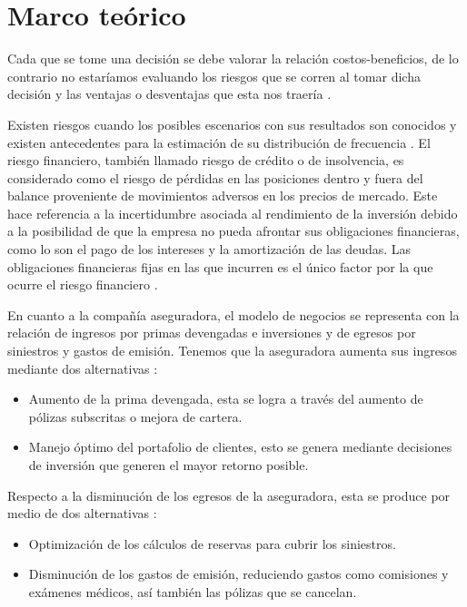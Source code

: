 \documentclass[journal]{IEEEtran}
\begin{document}
    \section{Marco teórico}

        Cada que se tome una decisión se debe valorar la relación costos-beneficios, de lo contrario no estaríamos evaluando los riesgos que se corren al tomar dicha decisión y las ventajas o desventajas que esta nos traería \cite{risk-definition}.
            
        Existen riesgos cuando los posibles escenarios con sus resultados son conocidos y existen antecedentes para la estimación de su distribución de frecuencia \cite{Bazzani}. El riesgo financiero, también llamado riesgo de crédito o de insolvencia, es considerado como el riesgo de pérdidas en las posiciones dentro y fuera del balance proveniente de movimientos adversos en los precios de mercado. Este hace referencia a la incertidumbre asociada al rendimiento de la inversión debido a la posibilidad de que la empresa no pueda afrontar sus obligaciones financieras, como lo son el pago de los intereses y la amortización de las deudas. Las obligaciones financieras fijas en las que incurren es el único factor por la que ocurre el riesgo financiero \cite{Bazzani}.
        
        En cuanto a la compañía aseguradora, el modelo de negocios se representa con la relación de ingresos por primas devengadas e inversiones y de egresos por siniestros y gastos de emisión. Tenemos que la aseguradora aumenta sus ingresos mediante dos alternativas \cite{aseguradora}:
        \begin{itemize}
            \item Aumento de la prima devengada, esta se logra a través del aumento de pólizas  subscritas o mejora de cartera.
            \item Manejo óptimo del portafolio de clientes, esto se genera mediante decisiones de inversión que generen el mayor retorno posible.
        \end{itemize}
        
        Respecto a la disminución de los egresos de la aseguradora, esta se produce por medio de dos alternativas \cite{aseguradora}:
        \begin{itemize}
            \item Optimización de los cálculos de reservas para cubrir los siniestros.
            \item Disminución de los gastos de emisión, reduciendo gastos como comisiones y exámenes médicos, así también las pólizas que se cancelan.
        \end{itemize}
        
\end{document}
